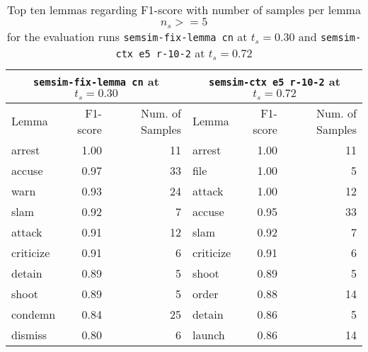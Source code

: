 \documentclass[11pt]{scrreprt}
\begin{document}
\begin{table}[ht]
\centering
\begin{tabular}{lrr|lrr}
\toprule
\multicolumn{3}{c|}{\texttt{semsim-fix-lemma cn} at \(t_s = 0.30\)} & \multicolumn{3}{c}{\texttt{semsim-ctx e5 r-10-2} at \(t_s = 0.72\)} \\ 
\midrule
Lemma      & F1-score & Num. of Samples & Lemma      & F1-score & Num. of Samples \\
\midrule
arrest     & 1.00     & 11            & arrest     & 1.00     & 11            \\
accuse     & 0.97     & 33            & file       & 1.00     & 5             \\
warn       & 0.93     & 24            & attack     & 1.00     & 12            \\
slam       & 0.92     & 7             & accuse     & 0.95     & 33            \\
attack     & 0.91     & 12            & slam       & 0.92     & 7             \\
criticize  & 0.91     & 6             & criticize  & 0.91     & 6             \\
detain     & 0.89     & 5             & shoot      & 0.89     & 5             \\
shoot      & 0.89     & 5             & order      & 0.88     & 14            \\
condemn    & 0.84     & 25            & detain     & 0.86     & 5             \\
dismiss    & 0.80     & 6             & launch     & 0.86     & 14            \\ 
\bottomrule
\end{tabular}
\caption{Top ten lemmas regarding F1-score with number of samples per lemma \(n_s >= 5\) \\
for the evaluation runs \texttt{semsim-fix-lemma cn} at \(t_s = 0.30\) and \texttt{semsim-ctx e5 r-10-2} at \(t_s = 0.72\)}
\label{tab:predicate-lemma-f1}
\end{table}
\end{document}
